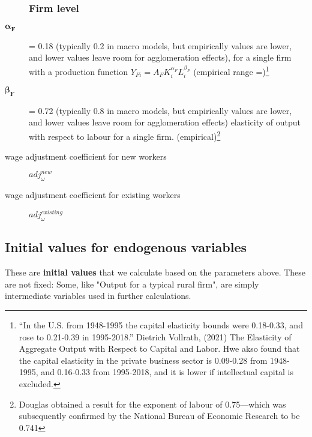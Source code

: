 \begin{description}



    \subsubsection{Firm level}
\item  [$\mathbf{\alpha_F}$] = 0.18 (typically 0.2 in macro models, but empirically values are lower, and lower values leave room for agglomeration effects),  for a single firm with a production function $Y_{Fi}=A_F K_i^{\alpha_F }L^{\beta_F}_i$ (empirical range =)\footnote{``In the U.S. from 1948-1995 the capital elasticity bounds were 0.18-0.33, and rose to 0.21-0.39 in 1995-2018.'' Dietrich Vollrath, (2021) The Elasticity of Aggregate Output with Respect to Capital and Labor. Hwe akso found that the capital elasticity in the private business sector is 0.09-0.28 from 1948-1995, and 0.16-0.33 from 1995-2018, and it is lower if intellectual capital is excluded.}

\item  [$\mathbf{\beta_F}$ ] = 0.72 (typically 0.8 in macro models, but empirically values are lower, and lower values leave room for agglomeration effects) elasticity of output with respect to labour for a single firm. (empirical)\footnote{Douglas  obtained a result for the exponent of labour of 0.75—which was subsequently confirmed by the National Bureau of Economic Research to be 0.741} 

\item [wage adjustment coefficient for new workers ] $adj^{new}_\omega$

\item [wage adjustment coefficient for existing workers] $adj^{existing}_\omega$

    
\end{description}




\subsection{Initial values for endogenous variables} \label{sec-init-value-list}

These are \textbf{initial values} that we calculate based on the parameters above. These are not fixed: Some, like "Output for a typical rural firm", are simply intermediate variables used in further calculations.%


